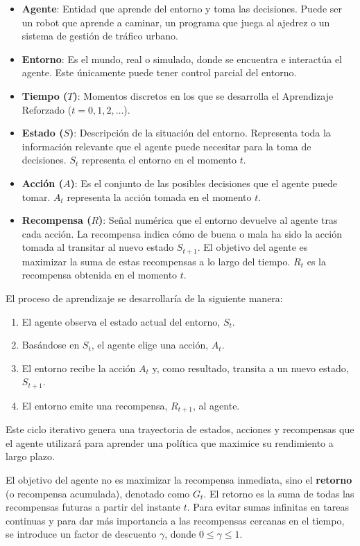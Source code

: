 \documentclass[12pt,a4paper]{book}
\begin{document}
\begin{itemize}
    \item \textbf{Agente}: Entidad que aprende del entorno y toma las decisiones. Puede ser un robot que aprende a caminar, un programa que juega al ajedrez o un sistema de gestión de tráfico urbano.
    \item \textbf{Entorno}: Es el mundo, real o simulado, donde se encuentra e interactúa el agente. Este únicamente puede tener control parcial del entorno.
    \item \textbf{Tiempo ($T$)}: Momentos discretos en los que se desarrolla el Aprendizaje Reforzado ($t=0, 1, 2, \dots$).
    \item \textbf{Estado ($S$)}: Descripción de la situación del entorno. Representa toda la información relevante que el agente puede necesitar para la toma de decisiones. $S_t$ representa el entorno en el momento $t$.
    \item \textbf{Acción ($A$)}: Es el conjunto de las posibles decisiones que el agente puede tomar. $A_t$ representa la acción tomada en el momento $t$.
    \item \textbf{Recompensa ($R$)}: Señal numérica que el entorno devuelve al agente tras cada acción. La recompensa indica cómo de buena o mala ha sido la acción tomada al transitar al nuevo estado $S_{t+1}$. El objetivo del agente es maximizar la suma de estas recompensas a lo largo del tiempo. $R_t$ es la recompensa obtenida en el momento $t$.
\end{itemize}

El proceso de aprendizaje se desarrollaría de la siguiente manera:
\begin{enumerate}
    \item El agente observa el estado actual del entorno, $S_t$.
    \item Basándose en $S_t$, el agente elige una acción, $A_t$.
    \item El entorno recibe la acción $A_t$ y, como resultado, transita a un nuevo estado, $S_{t+1}$.
    \item El entorno emite una recompensa, $R_{t+1}$, al agente.
\end{enumerate}
Este ciclo iterativo genera una trayectoria de estados, acciones y recompensas que el agente utilizará para aprender una política que maximice su rendimiento a largo plazo.

El objetivo del agente no es maximizar la recompensa inmediata, sino el \textbf{retorno} (o recompensa acumulada), denotado como $G_t$.
El retorno es la suma de todas las recompensas futuras a partir del instante $t$. 
Para evitar sumas infinitas en tareas continuas y para dar más importancia a las recompensas cercanas en el tiempo, se introduce un factor de descuento $\gamma$, donde $0 \le \gamma \le 1$.
\end{document}
